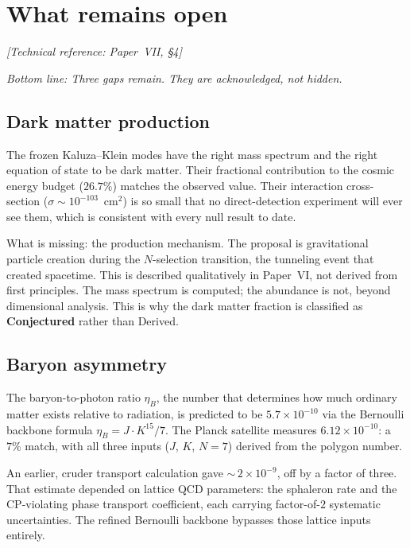 \section{What remains open}
\noindent\textit{[Technical reference: Paper~VII, \S4]}

\medskip

\noindent\textit{Bottom line: Three gaps remain. They are acknowledged,
not hidden.}

\medskip

\subsection*{Dark matter production}

The frozen Kaluza--Klein modes have the right mass spectrum and the right
equation of state to be dark matter. Their fractional contribution to
the cosmic energy budget ($26.7\%$) matches the observed value. Their
interaction cross-section ($\sigma \sim 10^{-103}$~cm$^2$) is so small
that no direct-detection experiment will ever see them, which is
consistent with every null result to date.

What is missing: the production mechanism. The proposal is gravitational
particle creation during the $N$-selection transition, the tunneling
event that created spacetime. This is described qualitatively in
Paper~VI, not derived from first principles. The mass spectrum is
computed; the abundance is not, beyond dimensional analysis. This is why
the dark matter fraction is classified as \textbf{Conjectured} rather
than Derived.

\subsection*{Baryon asymmetry}

The baryon-to-photon ratio $\eta_B$, the number that determines how
much ordinary matter exists relative to radiation, is predicted to be
$5.7 \times 10^{-10}$ via the Bernoulli backbone formula
$\eta_B = J \cdot K^{15}/7$. The Planck satellite measures
$6.12 \times 10^{-10}$: a $7\%$ match, with all three inputs
($J$, $K$, $N = 7$) derived from the polygon number.

An earlier, cruder transport calculation gave
${\sim}\,2 \times 10^{-9}$, off by a factor of three. That estimate
depended on lattice QCD parameters: the sphaleron rate
and the CP-violating phase transport coefficient, each carrying
factor-of-$2$ systematic uncertainties. The refined Bernoulli
backbone bypasses those lattice inputs entirely.

